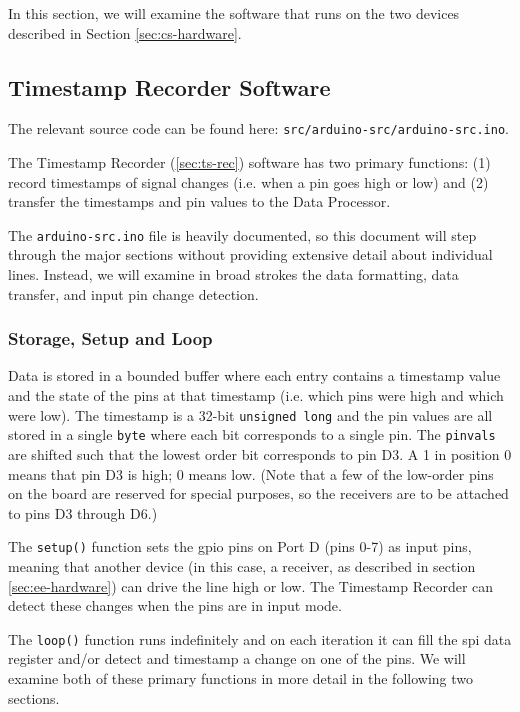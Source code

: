 \documentclass[12pt]{article}
\begin{document}
In this section, we will examine the software that runs on the two devices
described in Section \ref{sec:cs-hardware}.

\subsection{Timestamp Recorder Software}\label{sec:ts-rec-sw}

The relevant source code can be found here:
\texttt{src/arduino-src/arduino-src.ino}.

The Timestamp Recorder (\ref{sec:ts-rec}) software has two primary functions:
(1) record timestamps of signal changes (i.e. when a pin goes high or low) and
(2) transfer the timestamps and pin values to the Data Processor.

The \texttt{arduino-src.ino} file is heavily documented, so this document
will step through the major sections without providing extensive detail about
individual lines.
Instead, we will examine in broad strokes the data formatting, data
transfer, and input pin change detection.

\subsubsection{Storage, Setup and Loop}

Data is stored in a bounded buffer where each entry contains a timestamp value
and the state of the pins at that timestamp (i.e. which pins were high and
which were low).
The timestamp is a 32-bit \texttt{unsigned long} and the pin values are
all stored in a single \texttt{byte} where each bit corresponds to a single
pin.
The \texttt{pinvals} are shifted such that the lowest order bit corresponds
to pin D3.
A 1 in position 0 means that pin D3 is high; 0 means low.
(Note that a few of the low-order pins on the board are reserved for special
purposes, so the receivers are to be attached to pins D3 through D6.)

The \texttt{setup()} function sets the \gls{gpio} pins on Port D (pins 0-7)
as input pins, meaning that another device (in this case, a receiver, as
described in section \ref{sec:ee-hardware}) can drive the line high or low.
The Timestamp Recorder can detect these changes when the pins are in input
mode.

The \texttt{loop()} function runs indefinitely and on each iteration it can fill
the \gls{spi} data register and/or detect and timestamp a change on one of the
pins.
We will examine both of these primary functions in more detail in the following
two sections.
\end{document}
